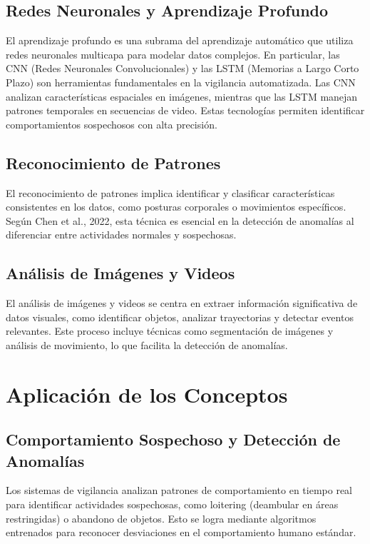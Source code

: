 \documentclass[listof=nochaptergap,12pt,times,authoryear]{report}
\begin{document}
\subsection{Redes Neuronales y Aprendizaje Profundo}
El aprendizaje profundo es una subrama del aprendizaje automático que utiliza redes neuronales multicapa para modelar datos complejos. En particular, las CNN (Redes Neuronales Convolucionales) y las LSTM (Memorias a Largo Corto Plazo) son herramientas fundamentales en la vigilancia automatizada. Las CNN analizan características espaciales en imágenes, mientras que las LSTM manejan patrones temporales en secuencias de video. Estas tecnologías permiten identificar comportamientos sospechosos con alta precisión.

\subsection{Reconocimiento de Patrones}
El reconocimiento de patrones implica identificar y clasificar características consistentes en los datos, como posturas corporales o movimientos específicos. Según Chen et al., 2022, esta técnica es esencial en la detección de anomalías al diferenciar entre actividades normales y sospechosas.

\subsection{Análisis de Imágenes y Videos}
El análisis de imágenes y videos se centra en extraer información significativa de datos visuales, como identificar objetos, analizar trayectorias y detectar eventos relevantes. Este proceso incluye técnicas como segmentación de imágenes y análisis de movimiento, lo que facilita la detección de anomalías.

\section{Aplicación de los Conceptos}

\subsection{Comportamiento Sospechoso y Detección de Anomalías}
Los sistemas de vigilancia analizan patrones de comportamiento en tiempo real para identificar actividades sospechosas, como loitering (deambular en áreas restringidas) o abandono de objetos. Esto se logra mediante algoritmos entrenados para reconocer desviaciones en el comportamiento humano estándar.
\end{document}
